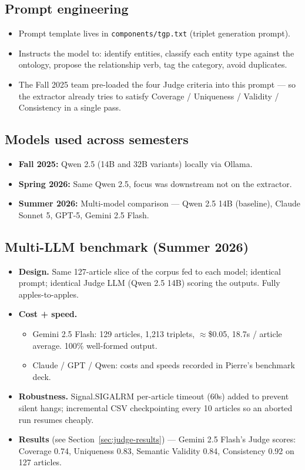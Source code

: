 \documentclass[11pt]{article}
\begin{document}
\subsection{Prompt engineering}
\begin{itemize}
  \item Prompt template lives in \texttt{components/tgp.txt} (triplet generation prompt).
  \item Instructs the model to: identify entities, classify each entity type against the ontology, propose the relationship verb, tag the category, avoid duplicates.
  \item The Fall 2025 team pre-loaded the four Judge criteria into this prompt --- so the extractor already tries to satisfy Coverage / Uniqueness / Validity / Consistency in a single pass.
\end{itemize}

\subsection{Models used across semesters}
\begin{itemize}
  \item \textbf{Fall 2025:} Qwen 2.5 (14B and 32B variants) locally via Ollama.
  \item \textbf{Spring 2026:} Same Qwen 2.5, focus was downstream not on the extractor.
  \item \textbf{Summer 2026:} Multi-model comparison --- Qwen 2.5 14B (baseline), Claude Sonnet 5, GPT-5, Gemini 2.5 Flash.
\end{itemize}

\subsection{Multi-LLM benchmark (Summer 2026)}
\label{sec:benchmark}
\begin{itemize}
  \item \textbf{Design.} Same 127-article slice of the corpus fed to each model; identical prompt; identical Judge LLM (Qwen 2.5 14B) scoring the outputs. Fully apples-to-apples.
  \item \textbf{Cost + speed.}
    \begin{itemize}
      \item Gemini 2.5 Flash: 129 articles, 1{,}213 triplets, \(\approx\)\$0.05, 18.7s / article average. 100\% well-formed output.
      \item Claude / GPT / Qwen: costs and speeds recorded in Pierre's benchmark deck.
    \end{itemize}
  \item \textbf{Robustness.} Signal.SIGALRM per-article timeout (60s) added to prevent silent hangs; incremental CSV checkpointing every 10 articles so an aborted run resumes cheaply.
  \item \textbf{Results} (see Section~\ref{sec:judge-results}) --- Gemini 2.5 Flash's Judge scores: Coverage 0.74, Uniqueness 0.83, Semantic Validity 0.84, Consistency 0.92 on 127 articles.
\end{itemize}
\end{document}
